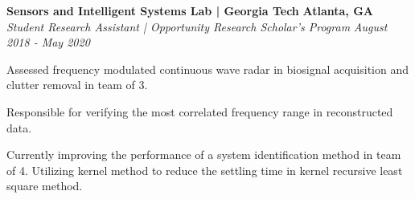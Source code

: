\headerrow
    {\textbf{Sensors and Intelligent Systems Lab | Georgia Tech}}
    {\textbf{Atlanta, GA}}
\\
\headerrow
    {\emph{Student Research Assistant | Opportunity Research Scholar's Program}}
    {\emph{August 2018 - May 2020}}
    
\begin{itemize*}
    \item Assessed frequency modulated continuous wave radar in biosignal acquisition and clutter removal in team of 3.
    \item Responsible for verifying the most correlated frequency range in reconstructed data.
    \item Currently improving the performance of a system identification method in team of 4. Utilizing kernel method to
        reduce the settling time in kernel recursive least square method. 
\end{itemize*}